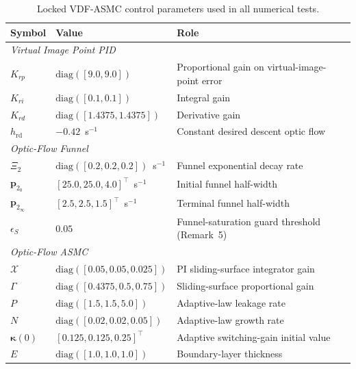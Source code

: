 \documentclass[10pt,journal]{IEEEtran}
\begin{document}
\begin{table}[!t]
    \centering
    \footnotesize
    \caption{Locked VDF-ASMC control parameters used in all numerical tests.}
    \label{sup:control params}
    \begin{tabular}{p{} p{} p{}}
    \toprule
        \textbf{Symbol} & \textbf{Value} & \textbf{Role}\\
    \midrule
        \multicolumn{3}{l}{\textit{Virtual Image Point PID}} \\
        $K_{rp}$ & $\text{diag}([9.0,9.0])$ & Proportional gain on virtual-image-point error \\
        $K_{ri}$ & $\text{diag}([0.1,0.1])$ & Integral gain \\
        $K_{rd}$ & $\text{diag}([1.4375,1.4375])$ & Derivative gain \\
        $h_\text{rd}$ & $-0.42$~s$^{-1}$ & Constant desired descent optic flow \\
    \midrule
        \multicolumn{3}{l}{\textit{Optic-Flow Funnel}} \\
        $\Xi_2$                     & $\text{diag}([0.2,0.2,0.2])$~s$^{-1}$ & Funnel exponential decay rate \\
        $\boldsymbol{p}_{2_0}$      & $[25.0,25.0,4.0]^\top$~s$^{-1}$ & Initial funnel half-width \\
        $\boldsymbol{p}_{2_\infty}$ & $[2.5,2.5,1.5]^\top$~s$^{-1}$ & Terminal funnel half-width \\
        $\epsilon_S$                & $0.05$ & Funnel-saturation guard threshold (Remark~5) \\
    \midrule
        \multicolumn{3}{l}{\textit{Optic-Flow ASMC}} \\
        $\mathcal{X}$           & $\text{diag}([0.05,0.05,0.025])$ & PI sliding-surface integrator gain \\
        $\Gamma$                & $\text{diag}([0.4375,0.5,0.75])$ & Sliding-surface proportional gain \\
        $P$                     & $\text{diag}([1.5,1.5,5.0])$ & Adaptive-law leakage rate \\
        $N$                     & $\text{diag}([0.02,0.02,0.05])$ & Adaptive-law growth rate \\
        $\boldsymbol{\kappa}(0)$ & $[0.125,0.125,0.25]^\top$ & Adaptive switching-gain initial value \\
        $E$                     & $\text{diag}([1.0,1.0,1.0])$ & Boundary-layer thickness \\

\end{tabular}
\end{table}
\end{document}
